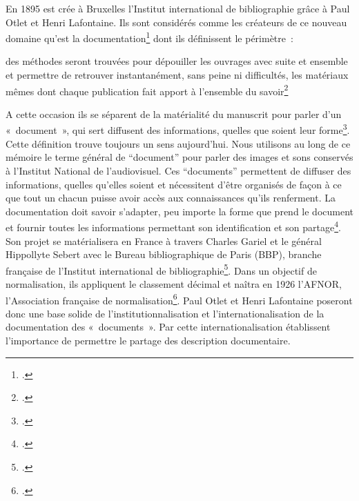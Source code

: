 En 1895 est crée à Bruxelles l’Institut international de bibliographie grâce à Paul Otlet et Henri Lafontaine. Ils sont considérés comme les créateurs de ce nouveau domaine qu’est la documentation\footcite[][45]{fayet-scribe2000} dont ils définissent le périmètre : 
\begin{displayquote}
	[…] des méthodes seront trouvées pour dépouiller les ouvrages avec suite et ensemble et permettre de retrouver instantanément, sans peine ni difficultés, les matériaux mêmes dont chaque publication fait apport à l’ensemble du savoir\footcite[Paul OTLET, « Les sciences bibliographiques et la documentation », Bulletin
	de l’IIB, 1903, pp.125-147. Retranscrit dans][48]{fayet-scribe2000}
\end{displayquote}
A cette occasion ils se séparent de la matérialité du manuscrit pour parler d’un « document », qui sert diffusent des informations, quelles que soient leur forme\footcite[][49]{fayet-scribe2000}. Cette définition trouve toujours un sens aujourd'hui. Nous utilisons au long de ce mémoire le terme général de \enquote{document} pour parler des images et sons conservés à l'Institut National de l'audiovisuel. Ces \enquote{documents} permettent de diffuser des informations, quelles qu'elles soient et nécessitent d'être organisés de façon à ce que tout un chacun puisse avoir accès aux connaissances qu'ils renferment. La documentation doit savoir s’adapter, peu importe la forme que prend le document et fournir toutes les informations permettant son identification et son partage\footcite[][55]{fayet-scribe2000}. Son projet se matérialisera en France à travers Charles Gariel et le général Hippollyte Sebert avec le Bureau bibliographique de Paris (BBP), branche française de l’Institut international de bibliographie\footcite[][62]{fayet-scribe2000}. Dans un objectif de normalisation, ils appliquent le classement décimal et naîtra en 1926 l’AFNOR, l’Association française de normalisation\footcite[][79]{fayet-scribe2000}. Paul Otlet et Henri Lafontaine poseront donc une base solide de l’institutionnalisation et l’internationalisation de la documentation des « documents ». Par cette internationalisation établissent l'importance de permettre le partage des description documentaire.


